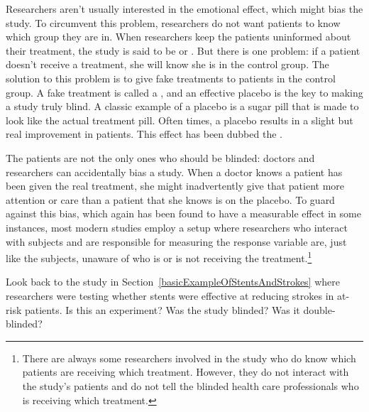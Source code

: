 Researchers aren't usually interested in the emotional effect, which might bias the study. To circumvent this problem, researchers do not want patients to know which group they are in. When researchers keep the patients uninformed about their treatment, the study is said to be  or . But there is one problem: if a patient doesn't receive a treatment, she will know she is in the control group. The solution to this problem is to give fake treatments to patients in the control group. A fake treatment is called a , and an effective placebo is the key to making a study truly blind. A classic example of a placebo is a sugar pill that is made to look like the actual treatment pill. Often times, a placebo results in a slight but real improvement in patients. This effect has been dubbed the .

The patients are not the only ones who should be blinded: doctors and researchers can accidentally bias a study. When a doctor knows a patient has been given the real treatment, she might inadvertently give that patient more attention or care than a patient that she knows is on the placebo. To guard against this bias, which again has been found to have a measurable effect in some instances, most modern studies employ a  setup where researchers who interact with subjects and are responsible for measuring the response variable are, just like the subjects, unaware of who is or is not receiving the treatment.\footnote{There are always some researchers involved in the study who do know which patients are receiving which treatment. However, they do not interact with the study's patients and do not tell the blinded health care professionals who is receiving which treatment.}


\begin{exercisewrap}
\begin{nexercise}
Look back to the study in Section~\ref{basicExampleOfStentsAndStrokes} where researchers were testing whether stents were effective at reducing strokes in at-risk patients. Is this an experiment? Was the study blinded? Was it double-blinded?\footnotemark
\end{nexercise}
\end{exercisewrap}



